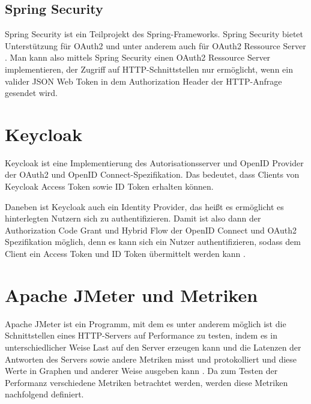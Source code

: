 \subsection{Spring Security}
Spring Security ist ein Teilprojekt des Spring-Frameworks. Spring Security bietet 
Unterstützung für OAuth2 und unter anderem auch für OAuth2 Ressource Server \citep{springsecurity:2021}. 
Man kann also mittels Spring Security einen OAuth2 Ressource Server implementieren, der 
Zugriff auf HTTP-Schnittstellen nur ermöglicht, wenn ein valider JSON Web Token in dem 
Authorization Header der HTTP-Anfrage gesendet wird. 

\section{Keycloak}
Keycloak ist eine Implementierung des Autorisationsserver und OpenID Provider der 
OAuth2 und OpenID Connect-Spezifikation. Das bedeutet, dass Clients von Keycloak Access 
Token sowie ID Token erhalten können.\smallskip

Daneben ist Keycloak auch ein Identity Provider, das heißt es ermöglicht es hinterlegten 
Nutzern sich zu authentifizieren. Damit ist also dann der Authorization Code Grant und 
Hybrid Flow der OpenID Connect und OAuth2 Spezifikation möglich, denn es kann sich ein 
Nutzer authentifizieren, sodass dem Client ein Access Token und ID Token übermittelt 
werden kann \citep{keycloak:2021}.

\section{Apache JMeter und Metriken}
\label{sec:ApacheJMeterundMetriken}
Apache JMeter ist ein Programm, mit dem es unter anderem möglich ist die Schnittstellen eines HTTP-Servers auf 
Performance zu testen, indem es in unterschiedlicher Weise Last auf den Server erzeugen 
kann und die Latenzen der Antworten des Servers sowie andere Metriken misst und 
protokolliert und diese Werte in Graphen und anderer Weise ausgeben kann \citep{jmeter:2021}.
Da zum Testen der Performanz verschiedene Metriken betrachtet werden, werden diese 
Metriken nachfolgend definiert. 

